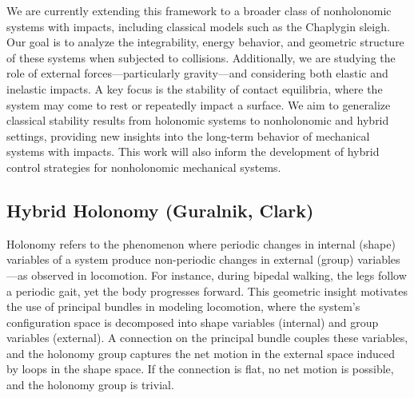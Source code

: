 \documentclass[letterpaper,11pt]{article}
\begin{document}
We are currently extending this framework to a broader class of nonholonomic systems with impacts, including classical models such as the Chaplygin sleigh. 
Our goal is to analyze the integrability, energy behavior, and geometric structure of these systems when subjected to collisions. 
Additionally, we are studying the role of external forces—particularly gravity—and considering both elastic and inelastic impacts. 
A key focus is the stability of contact equilibria, where the system may come to rest or repeatedly impact a surface. 
We aim to generalize classical stability results from holonomic systems to nonholonomic and hybrid settings, providing new insights into the long-term behavior of mechanical systems with impacts. 
This work will also inform the development of hybrid control strategies for nonholonomic mechanical systems.


\subsection{Hybrid Holonomy (Guralnik, Clark)}\label{sec:holonomy}

Holonomy refers to the phenomenon where periodic changes in internal (shape) variables of a system produce non-periodic changes in external (group) variables—as observed in locomotion. 
For instance, during bipedal walking, the legs follow a periodic gait, yet the body progresses forward. 
This geometric insight motivates the use of principal bundles in modeling locomotion, where the system’s configuration space is decomposed into shape variables (internal) and group variables (external). 
A connection on the principal bundle couples these variables, and the holonomy group captures the net motion in the external space induced by loops in the shape space. 
If the connection is flat, no net motion is possible, and the holonomy group is trivial.
\end{document}
